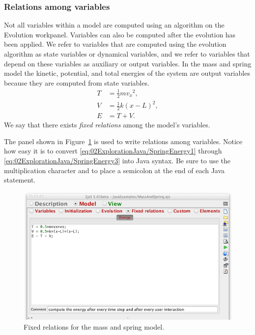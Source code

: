 \subsubsection{Relations among variables}\label{section:02ExplorationJavaInspectingRelations}
Not all variables within a model are computed using an algorithm on the Evolution workpanel. Variables can also be computed after the evolution has been applied. We refer to variables that are computed using the evolution algorithm as state variables or dynamical variables, and we refer to variables that depend on these variables as auxiliary or output variables. In the mass and
spring model the kinetic, potential, and total energies of the system are output variables because they are computed
from state variables.
\begin{align}
  T &= \frac{1}{2} m {v_x}^2,     \label{eq:02ExplorationJava/SpringEnergy1} \\
  V &= \frac{1}{2} k (x-L)^2,     \label{eq:02ExplorationJava/SpringEnergy2} \\
  E &= T + V.                     \label{eq:02ExplorationJava/SpringEnergy3}
\end{align}
We  say that there exists \emph{fixed relations} among the model's variables.

The  panel shown in Figure~\ref{fig:02ExplorationJava/ModelRelations} is used to write relations among
variables. Notice how easy it is to convert \eqref{eq:02ExplorationJava/SpringEnergy1} through
\eqref{eq:02ExplorationJava/SpringEnergy3} into Java syntax. Be sure to
use the multiplication character \lit{*} and to place a semicolon at the end of each Java statement.

\begin{figure}[htb]
    \centering
  \includegraphics[scale=\scale]{02ExplorationJava/images/ModelConstraints.png}
    \caption{Fixed relations for the mass and spring model.}
    \label{fig:02ExplorationJava/ModelRelations}
\end{figure}


